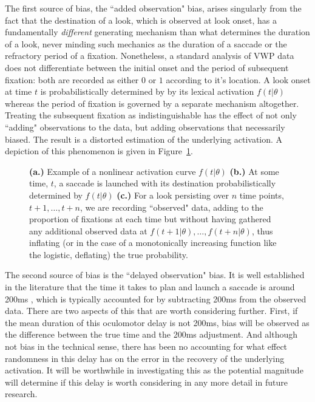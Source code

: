 The first source of bias, the ``added observation" bias, arises singularly from the fact that the destination of a look, which is observed at look onset, has a fundamentally \textit{different} generating mechanism than what determines the duration of a look, never minding such mechanics as the duration of a saccade or the refractory period of a fixation. Nonetheless, a standard analysis of VWP data does not differentiate between the initial onset and the period of subsequent fixation: both are recorded as either $0$ or $1$ according to it's location. A look onset at time $t$ is probabilistically determined by by its lexical activation $f(t|\theta)$ whereas the period of fixation is governed by a separate mechanism altogether. Treating the subsequent fixation as indistinguishable has the effect of not only ``adding" observations to the data, but adding observations that necessarily biased. The result is a distorted estimation of the underlying activation. A depiction of this phenomenon is given in Figure~\ref{fig:folly_of_fixation}. 


\begin{figure}[H]
    \centering
    \caption{ \textbf{(a.)} Example of a nonlinear activation curve $f(t|\theta)$ \textbf{(b.)} At some time, $t$, a saccade is launched with its destination probabilistically determined by $f(t|\theta)$ \textbf{(c.)} For a look persisting over $n$ time points, $t+1, \dots, t+n$, we are recording ``observed" data, adding to the proportion of fixations at each time but without having gathered any additional observed data at $f(t+1 | \theta), \dots,f(t+n | \theta)$, thus inflating (or in the case of a monotonically increasing function like the logistic, deflating) the true probability. }
\label{fig:folly_of_fixation}
\end{figure}

The second source of bias is the ``delayed observation" bias. It is well established in the literature that the time it takes to plan and launch a saccade is around 200ms \cite{viviani1990time}, which is typically accounted for by subtracting 200ms from the observed data. There are two aspects of this that are worth considering further. First, if the mean duration of this oculomotor delay is not 200ms, bias will be observed as the difference between the true time and the 200ms adjustment. And although not bias in the technical sense, there has been no accounting for what effect randomness in this delay has on the error in the recovery of the underlying activation. It will be worthwhile in investigating this as the potential magnitude will determine if this delay is worth considering in any more detail in future research.

